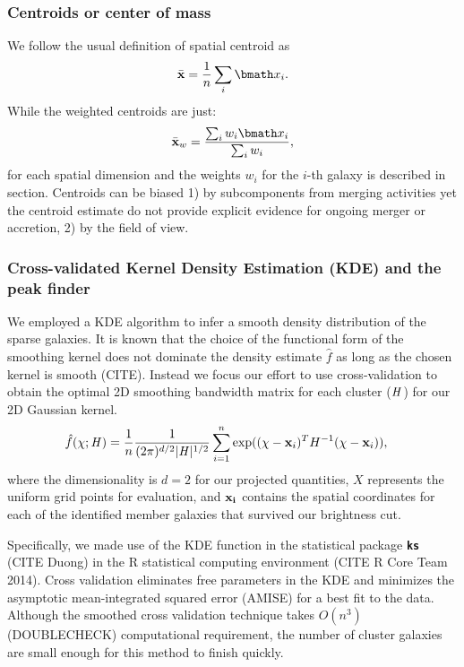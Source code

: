\subsubsection{Centroids or center of mass}
\label{Unweighted}
We follow the usual definition of spatial centroid as 
\begin{equation}
	\bar{\bf x} = \frac{1}{n} \sum_i \vec{x}_i. 
\end{equation}
While the weighted centroids are just: 
\begin{equation}
	\bar{\bf x}_w = \frac{\sum_i w_i \vec{x}_i}{\sum_i w_i},
\end{equation}
for each spatial dimension and the weights $w_i$ for the $i$-th galaxy
is described in section.
Centroids can be biased 1) by subcomponents from merging activities yet the
centroid estimate do not provide explicit evidence for ongoing merger or 
accretion, 2) by the field of view.

\subsubsection{Cross-validated Kernel Density Estimation (KDE) and the peak finder} 
\label{subsubsec:KDE}
We employed a KDE algorithm to infer a smooth density distribution of the
sparse galaxies.
It is known that the choice of the functional form of the smoothing kernel does
not dominate the density estimate $\hat{f}$ as long as the chosen kernel is
smooth (CITE). Instead we focus our effort to use cross-validation to obtain 
the optimal 2D smoothing
bandwidth matrix for each cluster ($\mathbf{\it H}$) for our 2D Gaussian kernel. 
\begin{align}
	\hat{f}(\chi; \mathbf{\it H}) &= \frac{1}{n} \frac{1}{(2\pi)^{d/2}|\mathbf{\it H}|^{1/2}}
	\sum_{i=1}^n \exp((\chi-{\bf x}_i)^T H^{-1} (\chi-{\bf x}_i)),
\end{align}
where the dimensionality is $d=2$ for our projected quantities,
$X$ represents the uniform grid points for evaluation, and 
$\bf{x}_i$ contains the spatial coordinates for each of the identified member 
galaxies that survived our brightness cut.

Specifically, we made use of the KDE function in
the statistical package {\bf \texttt{ks}} (CITE Duong) in the R statistical 
computing environment (CITE R Core Team 2014).
Cross validation eliminates free parameters in the KDE and minimizes
the asymptotic mean-integrated squared error (AMISE) for a best fit to the
data. Although the smoothed cross validation technique takes $O(n^3)$
(DOUBLECHECK) computational requirement, the number of cluster galaxies are
small enough for this method to finish quickly. 

